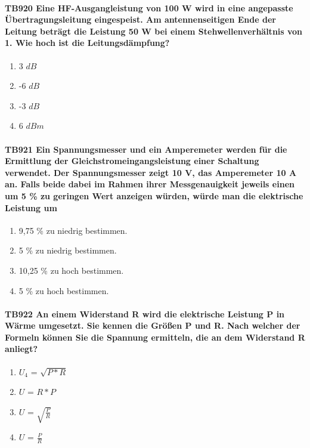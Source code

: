 \documentclass[8pt]{article}
\begin{document}
\begin{enumerate}
\begin{enumerate}[nolistsep,label=\Alph*]
\paragraph*{TB920 Eine HF-Ausgangleistung von 100 W wird in eine angepasste Übertragungsleitung eingespeist. Am antennenseitigen Ende der Leitung beträgt die Leistung 50 W bei einem Stehwellenverhältnis von 1. Wie hoch ist die Leitungsdämpfung?}
\begin{enumerate}[nolistsep,label=\Alph*]
\item 3 $dB$
\item -6 $dB$
\item -3 $dB$
\item 6 $dBm$
\end{enumerate}

\paragraph*{TB921 Ein Spannungsmesser und ein Amperemeter werden für die Ermittlung der Gleichstromeingangsleistung einer Schaltung verwendet. Der Spannungsmesser zeigt 10 V, das Amperemeter 10 A an. Falls beide dabei im Rahmen ihrer Messgenauigkeit jeweils einen um 5 \% zu geringen Wert anzeigen würden, würde man die elektrische Leistung um} 
\begin{enumerate}[nolistsep,label=\Alph*]
\item 9,75 \% zu niedrig bestimmen.
\item 5 \% zu niedrig bestimmen.
\item 10,25 \% zu hoch bestimmen.
\item 5 \% zu hoch bestimmen.
\end{enumerate}

\paragraph*{TB922 An einem Widerstand R wird die elektrische Leistung P in Wärme umgesetzt. Sie kennen die Größen P und R. Nach welcher der Formeln können Sie die Spannung ermitteln, die an dem Widerstand R anliegt?}
\begin{enumerate}[nolistsep,label=\Alph*]
\item $U_{4}$ = $\sqrt{P * R}$
\item $U$ = $R * P$
\item $U$ = $\sqrt{\frac{P}{R}}$
\item $U$ = $\frac{P}{R}$
\end{enumerate}


\end{enumerate}
\end{enumerate}
\end{document}
